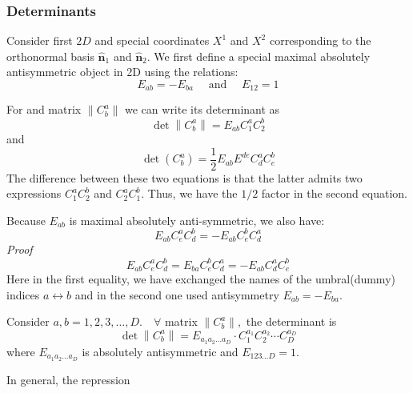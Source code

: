 \subsubsection{Determinants}
Consider first $2 D$ and special coordinates $X^{1}$ and $X^{2}$ corresponding to the orthonormal basis $\hat{\mathbf{n}}_{1}$ and $\hat{\mathbf{n}}_{2}$. We first define a special maximal absolutely antisymmetric object in 2D using the relations:
$$
E_{a b}=-E_{b a} \quad \text { and } \quad E_{12}=1
$$
\begin{qt}
For and matrix $\left\|C_{b}^{a}\right\|$ we can write its determinant as
\begin{equation}
\operatorname{det}\left\|C_{b}^{a}\right\|=E_{a b} C_{1}^{a} C_{2}^{b}
\end{equation}
and
\begin{equation}
\operatorname{det}\left(C_{b}^{a}\right)=\frac{1}{2} E_{a b} E^{d e} C_{d}^{a} C_{e}^{b}
\end{equation}
The difference between these two equations is that the latter admits two expressions $C_{1}^{a} C_{2}^{b}$ and $C_{2}^{a} C_{1}^{b}$. Thus, we have the $1/2$ factor in the second equation.
\end{qt}
Because $E_{ab}$ is maximal absolutely anti-symmetric, we also have:
\begin{equation}
E_{a b} C_{e}^{a} C_{d}^{b}=-E_{a b} C_{e}^{b} C_{d}^{a}
\end{equation}
\textit{Proof}
$$
E_{a b} C_{e}^{a} C_{d}^{b}=E_{b a} C_{e}^{b} C_{d}^{a}=-E_{a b} C_{d}^{a} C_{e}^{b}
$$
Here in the first equality, we have exchanged the names of the umbral(dummy) indices $a \leftrightarrow b$ and in the second one used antisymmetry $E_{a b}=-E_{b a}$. 
\begin{qt}
Consider $a, b=1,2,3, \ldots, D . \quad \forall$ matrix $\left\|C_{b}^{a}\right\|,$ the determinant is
\begin{equation}
\operatorname{det}\left\|C_{b}^{a}\right\|=E_{a_{1} a_{2} \dots a_{D}} \cdot C_{1}^{a_{1}} C_{2}^{a_{2}} \cdots C_{D}^{a_{D}}
\end{equation}
where $E_{a_1a_2\dots a_D}$ is absolutely antisymmetric and $E_{123\dots D}=1$. 
\end{qt}
In general, the repression

